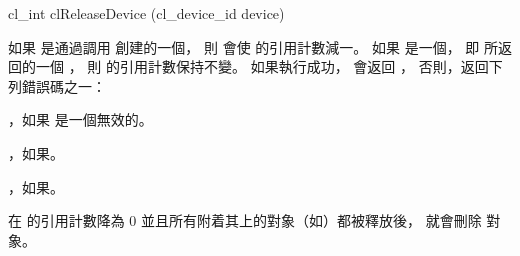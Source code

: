 
\startCLFUNC
cl_int clReleaseDevice (cl_device_id device)
\stopCLFUNC

如果  是通過調用  創建的一個，
則  會使  的引用計數減一。
如果  是一個，
即  所返回的一個 ，
則  的引用計數保持不變。
如果執行成功， 會返回 ，
否則，返回下列錯誤碼之一：
\startigBase
\item {}，如果  是一個無效的。
\item {}，如果\scdevfailres。
\item {}，如果\schostfailres。
\stopigBase

在  的引用計數降為 0 並且所有附着其上的對象（如）都被釋放後，
就會刪除  對象。

